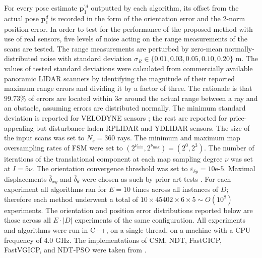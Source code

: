 For every pose estimate $\bm{p}_1^{\prime d}$ outputted by each algorithm, its
offset from the actual pose $\bm{p}_1^d$ is recorded in the form of the
orientation error and the $2$-norm position error.  In order to test for the
performance of the proposed method with use of real sensors, five levels of
noise acting on the range measurements of the scans are tested. The range
measurements are perturbed by zero-mean normally-distributed noise with
standard deviation $\sigma_R \in \{0.01, 0.03, 0.05, 0.10, 0.20\}$ m.  The
values of tested standard deviations were calculated from commercially
available panoramic LIDAR scanners by identifying the magnitude of their
reported maximum range errors and dividing it by a factor of three. The
rationale is that $99.73\%$ of errors are located within $3\sigma$ around the
actual range between a ray and an obstacle, assuming errors are distributed
normally. The minimum standard deviation is reported for VELODYNE sensors
\cite{velodyne_datasheet}; the rest are reported for price-appealing but
disturbance-laden RPLIDAR \cite{a2m8_datasheet} and YDLIDAR
\cite{ydlidar_datasheets} sensors. The size of the input scans was set to
$N_s=360$ rays. The minimum and maximum map oversampling rates of FSM were set
to $(2^{\nu_{\min}},2^{\nu_{\max}}) = (2^0,2^3)$.  The number of iterations of
the translational component at each map sampling degree $\nu$ was set at $I =
5\nu$. The orientation convergence threshold was set to $\varepsilon_{\delta p}
= 10$e-$5$. Maximal displacements $\overline{\delta}_{xy}$ and
$\overline{\delta}_\theta$ were chosen as such by prior art tests
\cite{Censi2008b}.  For each experiment all algorithms ran for $E = 10$ times
across all instances of $D$; therefore each method underwent a total of $10
\times 45402 \times 6 \times 5 \sim O(10^8)$ experiments. The orientation and
position error distributions reported below are those across all $E \cdot |D|$
experiments of the same configuration.  All experiments and algorithms were run
in C++, on a single thread, on a machine with a CPU frequency of $4.0$ GHz. The
implementations of CSM, NDT, FastGICP, FastVGICP, and NDT-PSO were taken from
\cite{implementations}.
